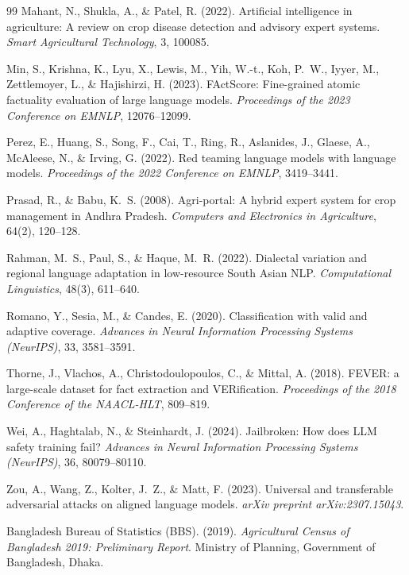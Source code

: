 \documentclass[11pt,a4paper]{article}
\begin{document}
\begin{thebibliography}{99}
 Mahant, N., Shukla, A., \& Patel, R. (2022). Artificial intelligence in agriculture: A review on crop disease detection and advisory expert systems. \textit{Smart Agricultural Technology}, 3, 100085.

 Min, S., Krishna, K., Lyu, X., Lewis, M., Yih, W.-t., Koh, P.~W., Iyyer, M., Zettlemoyer, L., \& Hajishirzi, H. (2023). FActScore: Fine-grained atomic factuality evaluation of large language models. \textit{Proceedings of the 2023 Conference on EMNLP}, 12076--12099.

 Perez, E., Huang, S., Song, F., Cai, T., Ring, R., Aslanides, J., Glaese, A., McAleese, N., \& Irving, G. (2022). Red teaming language models with language models. \textit{Proceedings of the 2022 Conference on EMNLP}, 3419--3441.

 Prasad, R., \& Babu, K.~S. (2008). Agri-portal: A hybrid expert system for crop management in Andhra Pradesh. \textit{Computers and Electronics in Agriculture}, 64(2), 120--128.

 Rahman, M.~S., Paul, S., \& Haque, M.~R. (2022). Dialectal variation and regional language adaptation in low-resource South Asian NLP. \textit{Computational Linguistics}, 48(3), 611--640.

 Romano, Y., Sesia, M., \& Candes, E. (2020). Classification with valid and adaptive coverage. \textit{Advances in Neural Information Processing Systems (NeurIPS)}, 33, 3581--3591.

 Thorne, J., Vlachos, A., Christodoulopoulos, C., \& Mittal, A. (2018). FEVER: a large-scale dataset for fact extraction and VERification. \textit{Proceedings of the 2018 Conference of the NAACL-HLT}, 809--819.

 Wei, A., Haghtalab, N., \& Steinhardt, J. (2024). Jailbroken: How does LLM safety training fail? \textit{Advances in Neural Information Processing Systems (NeurIPS)}, 36, 80079--80110.

 Zou, A., Wang, Z., Kolter, J.~Z., \& Matt, F. (2023). Universal and transferable adversarial attacks on aligned language models. \textit{arXiv preprint arXiv:2307.15043}.

 Bangladesh Bureau of Statistics (BBS). (2019). \textit{Agricultural Census of Bangladesh 2019: Preliminary Report}. Ministry of Planning, Government of Bangladesh, Dhaka.


\end{thebibliography}
\end{document}
